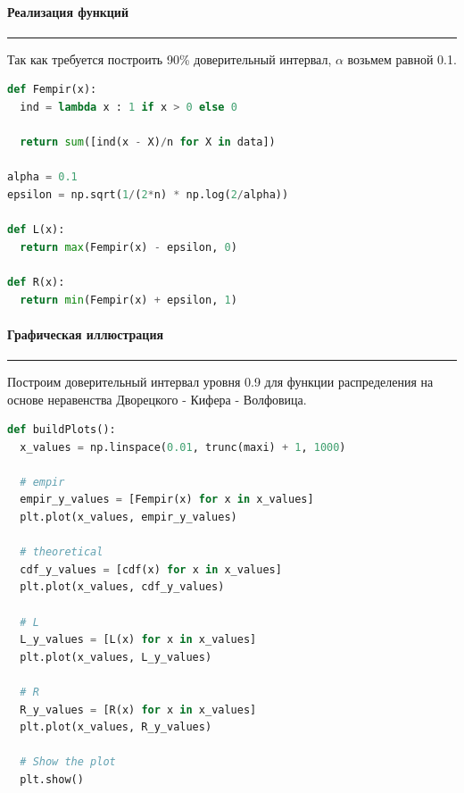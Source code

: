 \documentclass[a4paper, 14pt]{extarticle}
\begin{document}
\paragraph{Реализация функций}\vspace{-20pt}\rule{\linewidth}{0.1mm}

Так как требуется построить 90\% доверительный интервал, $\alpha$ возьмем равной 0.1.\\

\begin{center}
  \begin{lstlisting}[language=Python]
def Fempir(x):
  ind = lambda x : 1 if x > 0 else 0

  return sum([ind(x - X)/n for X in data])

alpha = 0.1
epsilon = np.sqrt(1/(2*n) * np.log(2/alpha))

def L(x):
  return max(Fempir(x) - epsilon, 0)

def R(x):
  return min(Fempir(x) + epsilon, 1)
  \end{lstlisting}
\end{center}
\vspace{10pt}

\paragraph{Графическая иллюстрация}\vspace{-20pt}\rule{\linewidth}{0.1mm}

Построим доверительный интервал уровня 0.9 для функции распределения на 
основе неравенства Дворецкого - Кифера - Волфовица.\\

\begin{center}
  \begin{lstlisting}[language=Python]
def buildPlots():
  x_values = np.linspace(0.01, trunc(maxi) + 1, 1000)

  # empir
  empir_y_values = [Fempir(x) for x in x_values]
  plt.plot(x_values, empir_y_values)

  # theoretical
  cdf_y_values = [cdf(x) for x in x_values]
  plt.plot(x_values, cdf_y_values)

  # L
  L_y_values = [L(x) for x in x_values]
  plt.plot(x_values, L_y_values)

  # R
  R_y_values = [R(x) for x in x_values]
  plt.plot(x_values, R_y_values)

  # Show the plot
  plt.show()
  \end{lstlisting}
\end{center}
\vspace{10pt}
\end{document}
